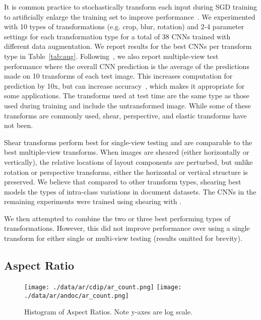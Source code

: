 \documentclass[10pt, conference, compsocconf]{IEEEtran}
\begin{document}
It is common practice to stochastically transform each input during SGD training to artificially enlarge the training set to improve performance~\cite{krizhevsky12,he15residual}.
We experimented with 10 types of transformations (e.g. crop, blur, rotation) and 2-4 parameter settings for each transformation type for a total of 38 CNNs trained with different data augmentation.
We report results for the best CNNs per transform type in Table~\ref{tab:aug}.
Following~\cite{simonyan14}, we also report multiple-view test performance where the overall CNN prediction is the average of the predictions made on 10 transforms of each test image.
This increases computation for prediction by 10x, but can increase accuracy~\cite{krizhevsky12}, which makes it appropriate for some applications.
The transforms used at test time are the same type as those used during training and include the untransformed image.
While some of these transforms are commonly used, shear, perspective, and elastic transforms have not been.

Shear transforms perform best for single-view testing and are comparable to the best multiple-view transforms.
When images are sheared (either horizontally or vertically), the relative locations of layout components are perturbed, but unlike rotation or perspective transforms, either the horizontal or vertical structure is preserved.
We believe that compared to other transform types, shearing best models the types of intra-class variations in document datasets.
The CNNs in the remaining experiments were trained using shearing with .

We then attempted to combine the two or three best performing types of transformations.
However, this did not improve performance over using a single transform for either single or multi-view testing (results omitted for brevity).


\subsection{Aspect Ratio}

\begin{figure}

\texttt{[image: ./data/ar/cdip/ar\_count.png]}
\texttt{[image: ./data/ar/andoc/ar\_count.png]}

\caption{Histogram of Aspect Ratios. Note y-axes are log scale.}
\label{fig:ar}
\end{figure}
\end{document}
